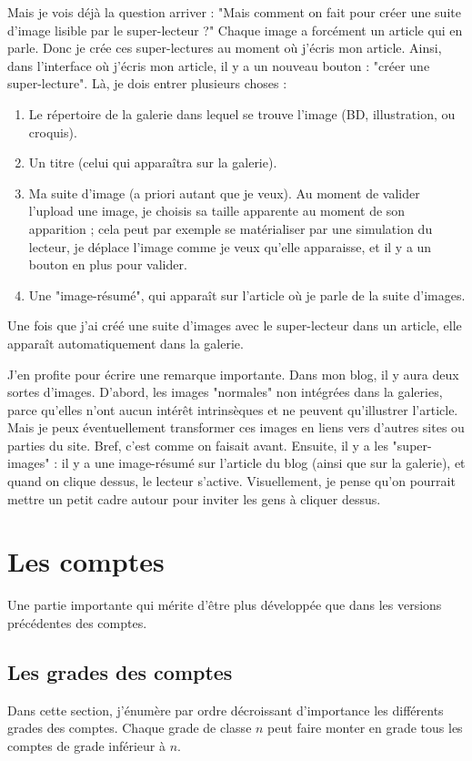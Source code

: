 \documentclass[french]{report}
\theoremstyle{plain}
\begin{document}
			Mais je vois déjà la question arriver : "Mais comment on fait pour créer une suite d'image lisible par le super-lecteur ?" Chaque image a forcément un article qui en parle. Donc je crée ces super-lectures au moment où j'écris mon article. Ainsi, dans l'interface où j'écris mon article, il y a un nouveau bouton : "créer une super-lecture". Là, je dois entrer plusieurs choses :
			\begin{enumerate}
				\item Le répertoire de la galerie dans lequel se trouve l'image (BD, illustration, ou croquis).
				\item Un titre (celui qui apparaîtra sur la galerie).
				\item Ma suite d'image (a priori autant que je veux). Au moment de valider l'upload une image, je choisis sa taille apparente au moment de son apparition ; cela peut par exemple se matérialiser par une simulation du lecteur, je déplace l'image comme je veux qu'elle apparaisse, et il y a un bouton en plus pour valider.
				\item Une "image-résumé", qui apparaît sur l'article où je parle de la suite d'images. 
			\end{enumerate}

			Une fois que j'ai créé une suite d'images avec le super-lecteur dans un article, elle apparaît automatiquement dans la galerie.

			J'en profite pour écrire une remarque importante. Dans mon blog, il y aura deux sortes d'images. D'abord, les images "normales" non intégrées dans la galeries, parce qu'elles n'ont aucun intérêt intrinsèques et ne peuvent qu'illustrer l'article. Mais je peux éventuellement transformer ces images en liens vers d'autres sites ou parties du site. Bref, c'est comme on faisait avant. Ensuite, il y a les "super-images" : il y a une image-résumé sur l'article du blog (ainsi que sur la galerie), et quand on clique dessus, le lecteur s'active. Visuellement, je pense qu'on pourrait mettre un petit cadre autour pour inviter les gens à cliquer dessus.

\chapter{Les comptes}
	Une partie importante qui mérite d'être plus développée que dans les versions précédentes des comptes. 
	\section{Les grades des comptes}
		Dans cette section, j'énumère par ordre décroissant d'importance les différents grades des comptes. Chaque grade de classe $n$ peut faire monter en grade tous les comptes de grade inférieur à $n$.
\end{document}
